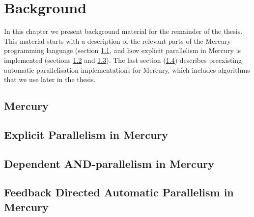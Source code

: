 
\chapter{Background}
\label{chap:backgnd}

In this chapter we present background material for the remainder of the
thesis.
This material starts with a description of the relevant parts of the Mercury
programming language (section \ref{sec:backgnd_mercury},
and how explicit parallelism in Mercury is implemented
(sections \ref{sec:backgnd_merpar} and \ref{sec:backgnd_deppar}).
The last section (\ref{sec:backgnd_autopar}) describes preexisting automatic
parallelisation implementations for Mercury,
which includes algorithms that we use later in the thesis.

\section{Mercury}
\label{sec:backgnd_mercury}


\section{Explicit Parallelism in Mercury}
\label{sec:backgnd_merpar}


\section{Dependent AND-parallelism in Mercury}
\label{sec:backgnd_deppar}


\section{Feedback Directed Automatic Parallelism in Mercury}
\label{sec:backgnd_autopar}


